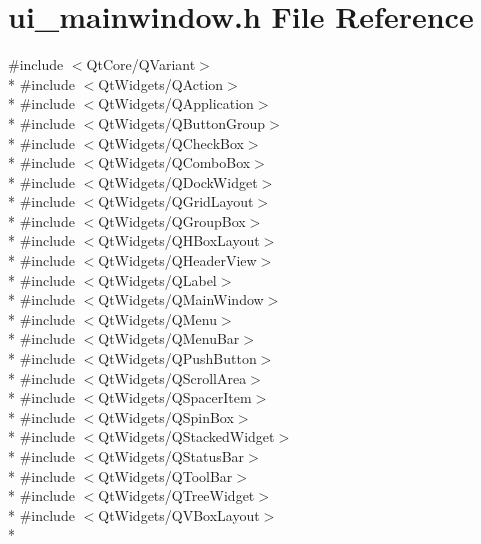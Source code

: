 \hypertarget{a00052}{\section{ui\+\_\+mainwindow.\+h File Reference}
\label{a00052}
}
{\ttfamily \#include $<$Qt\+Core/\+Q\+Variant$>$}\\*
{\ttfamily \#include $<$Qt\+Widgets/\+Q\+Action$>$}\\*
{\ttfamily \#include $<$Qt\+Widgets/\+Q\+Application$>$}\\*
{\ttfamily \#include $<$Qt\+Widgets/\+Q\+Button\+Group$>$}\\*
{\ttfamily \#include $<$Qt\+Widgets/\+Q\+Check\+Box$>$}\\*
{\ttfamily \#include $<$Qt\+Widgets/\+Q\+Combo\+Box$>$}\\*
{\ttfamily \#include $<$Qt\+Widgets/\+Q\+Dock\+Widget$>$}\\*
{\ttfamily \#include $<$Qt\+Widgets/\+Q\+Grid\+Layout$>$}\\*
{\ttfamily \#include $<$Qt\+Widgets/\+Q\+Group\+Box$>$}\\*
{\ttfamily \#include $<$Qt\+Widgets/\+Q\+H\+Box\+Layout$>$}\\*
{\ttfamily \#include $<$Qt\+Widgets/\+Q\+Header\+View$>$}\\*
{\ttfamily \#include $<$Qt\+Widgets/\+Q\+Label$>$}\\*
{\ttfamily \#include $<$Qt\+Widgets/\+Q\+Main\+Window$>$}\\*
{\ttfamily \#include $<$Qt\+Widgets/\+Q\+Menu$>$}\\*
{\ttfamily \#include $<$Qt\+Widgets/\+Q\+Menu\+Bar$>$}\\*
{\ttfamily \#include $<$Qt\+Widgets/\+Q\+Push\+Button$>$}\\*
{\ttfamily \#include $<$Qt\+Widgets/\+Q\+Scroll\+Area$>$}\\*
{\ttfamily \#include $<$Qt\+Widgets/\+Q\+Spacer\+Item$>$}\\*
{\ttfamily \#include $<$Qt\+Widgets/\+Q\+Spin\+Box$>$}\\*
{\ttfamily \#include $<$Qt\+Widgets/\+Q\+Stacked\+Widget$>$}\\*
{\ttfamily \#include $<$Qt\+Widgets/\+Q\+Status\+Bar$>$}\\*
{\ttfamily \#include $<$Qt\+Widgets/\+Q\+Tool\+Bar$>$}\\*
{\ttfamily \#include $<$Qt\+Widgets/\+Q\+Tree\+Widget$>$}\\*
{\ttfamily \#include $<$Qt\+Widgets/\+Q\+V\+Box\+Layout$>$}\\*
